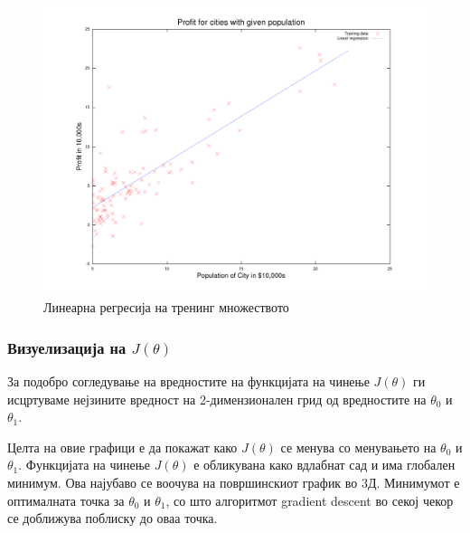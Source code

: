 \begin{figure}[htb]
\centering
\includegraphics[width=.9\textwidth]{src/linearRegression/line_fit}
\caption{Линеарна регресија на тренинг множеството}
\label{fig:linear_fit}
\end{figure}

\subsubsection{Визуелизација на $J(\theta)$}
За подобро согледување на вредностите на функцијата на чинење $J(\theta)$ ги
исцртуваме нејзините вредност на 2-димензионален грид од вредностите
на $\theta_0$ и $\theta_1$.

Целта на овие графици е да покажат како $J(\theta)$ се менува со менувањето на
$\theta_0$ и $\theta_1$. Функцијата на чинење $J(\theta)$ е обликувана како
вдлабнат сад и има глобален минимум. Ова најубаво се воочува на површинскиот
график во 3Д. Минимумот е оптималната точка за $\theta_0$ и $\theta_1$, со што
алгоритмот gradient descent во секој чекор се доближува поблиску до оваа точка.


